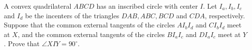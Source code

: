 A convex  quadrilateral 
$ABCD$
 has an inscribed circle with center 
$I$.
 Let 
$I_a, I_b, I_c$
 and 
$I_d$
 be the incenters of the triangles 
$DAB, ABC, BCD$
 and 
$CDA$,
 respectively. Suppose that the common external tangents of the circles 
$AI_bI_d$
 and 
$CI_bI_d$
 meet at 
$X$,
 and the common external tangents of the circles 
$BI_aI_c$
 and 
$DI_aI_c$
 meet at 
$Y$.
 Prove that 
$\angle{XIY}=90^{\circ}$.
